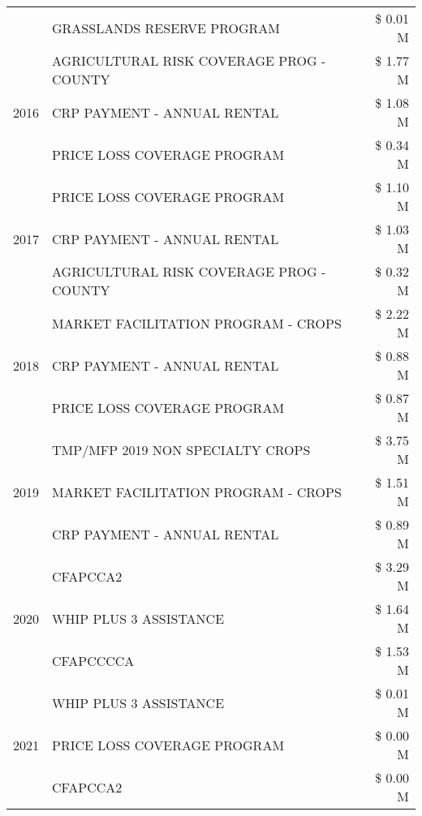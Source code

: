 \begin{tabular}{llr}
 & GRASSLANDS RESERVE PROGRAM & \$ 0.01 M \\
\cline{1-3}
\multirow[t]{3}{*}{2016} & AGRICULTURAL RISK COVERAGE PROG - COUNTY & \$ 1.77 M \\
 & CRP PAYMENT - ANNUAL RENTAL & \$ 1.08 M \\
 & PRICE LOSS COVERAGE PROGRAM & \$ 0.34 M \\
\cline{1-3}
\multirow[t]{3}{*}{2017} & PRICE LOSS COVERAGE PROGRAM & \$ 1.10 M \\
 & CRP PAYMENT - ANNUAL RENTAL & \$ 1.03 M \\
 & AGRICULTURAL RISK COVERAGE PROG - COUNTY & \$ 0.32 M \\
\cline{1-3}
\multirow[t]{3}{*}{2018} & MARKET FACILITATION PROGRAM - CROPS & \$ 2.22 M \\
 & CRP PAYMENT - ANNUAL RENTAL & \$ 0.88 M \\
 & PRICE LOSS COVERAGE PROGRAM & \$ 0.87 M \\
\cline{1-3}
\multirow[t]{3}{*}{2019} & TMP/MFP 2019 NON SPECIALTY CROPS & \$ 3.75 M \\
 & MARKET FACILITATION PROGRAM - CROPS & \$ 1.51 M \\
 & CRP PAYMENT - ANNUAL RENTAL & \$ 0.89 M \\
\cline{1-3}
\multirow[t]{3}{*}{2020} & CFAPCCA2 & \$ 3.29 M \\
 & WHIP PLUS 3 ASSISTANCE & \$ 1.64 M \\
 & CFAPCCCCA & \$ 1.53 M \\
\cline{1-3}
\multirow[t]{3}{*}{2021} & WHIP PLUS 3 ASSISTANCE & \$ 0.01 M \\
 & PRICE LOSS COVERAGE PROGRAM & \$ 0.00 M \\
 & CFAPCCA2 & \$ 0.00 M \\
\cline{1-3}
\bottomrule
\end{tabular}
